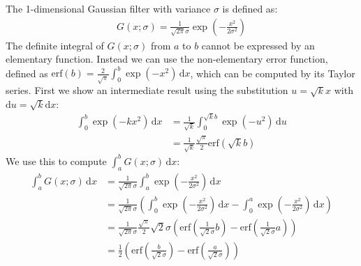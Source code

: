\documentclass[thesis.tex]{subfiles}
\begin{document}
The 1-dimensional Gaussian filter with variance $\sigma$ is defined as:
%
\begin{align*}
G(x;\sigma) = \frac{1}{\sqrt{2\pi} \sigma}
\exp\left( -\frac{x^2}{2 \sigma^2} \right)
\end{align*}
%
The definite integral of $G(x;\sigma)$ from $a$ to $b$ cannot be expressed by an elementary function. Instead we can use the non-elementary error function, defined as $\mathrm{erf}(b) = \frac{2}{\sqrt{\pi}} \int_0^b \exp(-x^2) \,\mathrm dx$, which can be computed by its Taylor series. First we show an intermediate result using the substitution $u = \sqrt{k} x$ with $\mathrm du = \sqrt{k} \mathrm dx$:
%
\begin{align*}
\int_0^b \exp(-k x^2) \,\mathrm dx
&= \frac{1}{\sqrt{k}} \int_0^{\sqrt{k}b} \exp(-u^2) \,\mathrm du \\
&= \frac{1}{\sqrt{k}} \frac{\sqrt{\pi}}{2} \mathrm{erf} \left( \sqrt{k} b \right)
\end{align*}
%
We use this to compute $\int_a^b G(x;\sigma) \,\mathrm dx$:
%
\begin{align*}
\int_a^b G(x;\sigma) \,\mathrm dx
&= \frac{1}{\sqrt{2\pi} \sigma} \int_a^b \exp\left( -\frac{x^2}{2 \sigma^2} \right) \,\mathrm dx \\
&= \frac{1}{\sqrt{2\pi} \sigma} \left( \int_0^b \exp\left( -\frac{x^2}{2 \sigma^2} \right) \,\mathrm dx - \int_0^a \exp\left( -\frac{x^2}{2 \sigma^2} \right) \,\mathrm dx \right) \\
&= \frac{1}{\sqrt{2\pi} \sigma} \frac{\sqrt{\pi}}{2} \sqrt{2} \sigma \left(
\mathrm{erf} \left( \frac{1}{\sqrt{2} \sigma} b \right) -
\mathrm{erf} \left( \frac{1}{\sqrt{2} \sigma} a \right) \right) \\
&= \frac{1}{2} \left(
\mathrm{erf} \left( \frac{b}{\sqrt{2} \sigma} \right) -
\mathrm{erf} \left( \frac{a}{\sqrt{2} \sigma} \right)
\right)
\end{align*}
%
%
\end{document}
